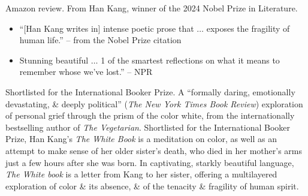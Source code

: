 \documentclass{article}
\begin{document}
\begin{enumerate}
	{\sf Amazon review.} From {\sc Han Kang}, winner of the 2024 Nobel Prize in Literature.
	\begin{itemize}
		\item ``[{\sc Han Kang} writes in] intense poetic prose that $\ldots$ exposes the fragility of human life.'' -- from the Nobel Prize citation
		\item Stunning beautiful $\ldots$ 1 of the smartest reflections on what it means to remember whose we've lost.'' -- NPR
	\end{itemize}
	Shortlisted for the International Booker Prize. A ``formally daring, emotionally devastating, \& deeply political'' ({\it The New York Times Book Review}) exploration of personal grief through the prism of the color white, from the internationally bestselling author of {\it The Vegetarian}. Shortlisted for the International Booker Prize, {\sc Han Kang}'s {\it The White Book} is a meditation on color, as well as an attempt to make sense of her older sister's death, who died in her mother's arms just a few hours after she was born. In captivating, starkly beautiful language, {\it The White book} is a letter from {\sc Kang} to her sister, offering a multilayered exploration of color \& its absence, \& of the tenacity \& fragility of human spirit.


\end{enumerate}
\end{document}
